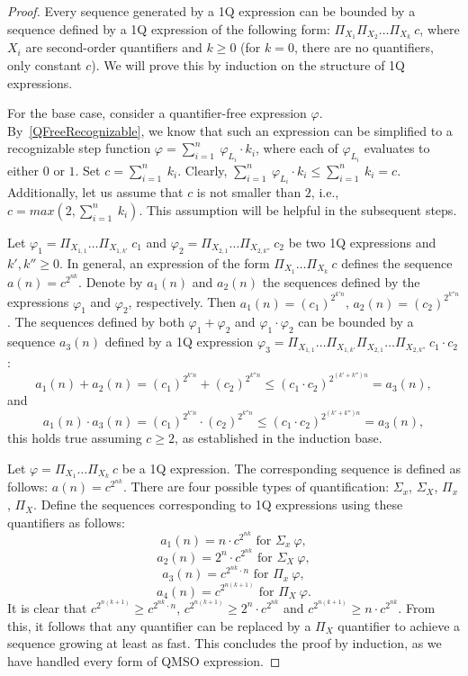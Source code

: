 \documentclass[en]{pracamgr}
\theoremstyle{definition}
\begin{document}
\begin{proof}
    Every sequence generated by a 1Q expression can be bounded by a sequence defined by a 1Q expression of the following form: $\Pi_{X_1}\Pi_{X_2}\ldots \Pi_{X_k} \ c$, where $X_i$ are second-order quantifiers and $k \geq 0$ (for $k = 0$, there are no quantifiers, only constant $c$). We will prove this by induction on the structure of 1Q expressions.

    For the base case, consider a quantifier-free expression $\varphi$. By~\cref{QFreeRecognizable}, we know that such an expression can be simplified to a recognizable step function $\varphi = \sum_{i = 1}^{n} \ \varphi_{L_i} \cdot k_i$, where each of $\varphi_{L_i}$ evaluates to either $0$ or $1$. Set $c = \sum_{i=1}^n \ k_i$. Clearly, $\sum_{i = 1}^{n} \ \varphi_{L_i} \cdot k_i \leq  \sum_{i=1}^n \ k_i = c$. Additionally, let us assume that $c$ is not smaller than $2$, i.e., $c = max(2, \sum_{i=1}^n \ k_i)$. This assumption will be helpful in the subsequent steps.

    Let $\varphi_1 = \Pi_{X_{1,1}}\ldots \Pi_{X_{1,k'}} \ c_1$ and $\varphi_2 = \Pi_{X_{2,1}}\ldots \Pi_{X_{2,k''}} \ c_2$ be two 1Q expressions and $k', k'' \geq 0$. In general, an expression of the form $\Pi_{X_1}\ldots \Pi_{X_k} \ c$ defines the sequence $a(n) = c^{2^{nk}}$. Denote by $a_1(n)$ and $a_2(n)$ the sequences defined by the expressions $\varphi_1$ and $\varphi_2$, respectively. Then $a_1(n) = (c_1)^{2^{k'n}}$, $a_2(n) = (c_2)^{2^{k''n}}$. The sequences defined by both $\varphi_1 + \varphi_2$ and $\varphi_1 \cdot \varphi_2$ can be bounded by a sequence $a_3(n)$ defined by a 1Q expression $\varphi_3 = \Pi_{X_{1,1}} \ldots \Pi_{X_{1,k'}} \Pi_{X_{2,1}} \ldots \Pi_{X_{2,k''}} \ c_1 \cdot c_2$:
    $$a_1(n) + a_2(n) = (c_1)^{2^{k'n}} + (c_2)^{2^{k''n}} \leq (c_1 \cdot c_2)^{2^{(k' + k'')n}} = a_3(n),$$
    and
    $$a_1(n) \cdot a_3(n) = (c_1)^{2^{k'n}} \cdot (c_2)^{2^{k''n}} \leq (c_1 \cdot c_2)^{2^{(k' + k'')n}} = a_3(n),$$
    this holds true assuming $c \geq 2$, as established in the induction base.

    Let $\varphi = \Pi_{X_1}\ldots \Pi_{X_k} \ c$ be a 1Q expression. The corresponding sequence is defined as follows: $a(n) = c^{2^{nk}}$. There are four possible types of quantification: $\Sigma_x$, $\Sigma_X$, $\Pi_x$, $\Pi_X$. Define the sequences corresponding to 1Q expressions using these quantifiers as follows:
    $$a_1(n) = n \cdot c^{2^{nk}} \text{ for } \Sigma_x \ \varphi,$$
    $$a_2(n) = 2^n \cdot c^{2^{nk}} \text{ for } \Sigma_X \ \varphi,$$
    $$a_3(n) = c^{2^{nk} \cdot n} \text{ for } \Pi_x \ \varphi,$$
    $$a_4(n) = c^{2^{n(k+1)}} \text{ for } \Pi_X \ \varphi.$$
    It is clear that $c^{2^{n(k+1)}} \geq c^{2^{nk} \cdot n}$, $c^{2^{n(k+1)}} \geq 2^n \cdot c^{2^{nk}}$ and $c^{2^{n(k+1)}} \geq n \cdot c^{2^{nk}}$. From this, it follows that any quantifier can be replaced by a $\Pi_X$ quantifier to achieve a sequence growing at least as fast. This concludes the proof by induction, as we have handled every form of QMSO expression.


\end{proof}
\end{document}
